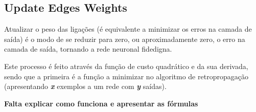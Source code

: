 \documentclass[10pt,a4paper]{article}
\begin{document}
\subsection{Update Edges Weights}
Atualizar o peso das ligações (é equivalente a minimizar os erros na camada de saída) é o modo de se reduzir para zero, ou aproximadamente zero, o erro na camada de saída, tornando a rede neuronal fidedigna.

Este processo é feito através da função de custo quadrático e da sua derivada, sendo que a primeira é a função a minimizar no algoritmo de retropropagação (apresentando \textbf{\textit{x}} exemplos a um rede com \textbf{\textit{y}} saídas).

 \textbf{Falta explicar como funciona e apresentar as fórmulas}
\end{document}
